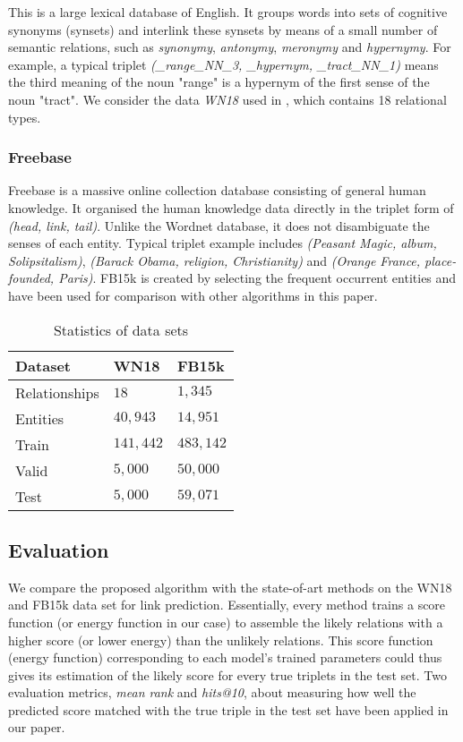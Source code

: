 \documentclass[9pt]{sig-alternate-05-2015}
\begin{document}
This is a large lexical database of English. It groups words into sets of cognitive synonyms (synsets) and interlink these synsets by means of a small number of semantic relations, such as \emph{synonymy}, \emph{antonymy}, \emph{meronymy} and \emph{hypernymy}.  For example, a typical triplet \emph{(\_range\_NN\_3, \_hypernym, \_tract\_NN\_1)} means the third meaning of the noun "range"  is a hypernym of the first sense of the noun "tract". We consider the data \emph{WN18} used in \cite{bordes_semantic_2014}, which contains 18 relational types.

\subsubsection{Freebase} 
Freebase is a massive online collection database consisting of general human knowledge. It organised the human knowledge data  directly in the triplet form of \emph{(head, link, tail)}. Unlike the Wordnet database, it does not disambiguate the senses of each entity. Typical triplet example includes \emph{(Peasant Magic, album, Solipsitalism)}, \emph{(Barack Obama, religion, Christianity)} and \emph{(Orange France, place-founded, Paris)}. FB15k \cite{bordes_learning_2011} is created by selecting the frequent occurrent entities and have been used for comparison with other algorithms in this paper.

\begin{table}[t]
\caption{Statistics of data sets} \label{data}
\centering
\begin{tabular}[center]{|l |l l |} 
 \hline
Dataset & WN18 & FB15k \\
 \hline 
Relationships & $18$ & $1,345$ \\
Entities & $40,943$ & $14,951$ \\
Train & $141,442$ & $483,142$ \\
Valid & $5,000$ & $50,000$ \\
Test & $5,000$ & $59,071$ \\
\hline
 \end{tabular}
 \end{table}
 
\subsection{Evaluation}
We compare the proposed algorithm with the state-of-art  methods on the WN18 and FB15k data set for link prediction. Essentially, every method trains a score function (or energy function in our case) to assemble the likely relations with a higher score (or lower energy) than the unlikely relations. This score function (energy function) corresponding to each model's trained parameters could thus gives its estimation of the likely score for every true triplets in the test set. Two evaluation metrics\cite{bordes_learning_2011}, \emph{mean rank} and \emph{hits@10}, about measuring how well the predicted score matched with the true triple in the test set have been applied in our paper.
\end{document}
